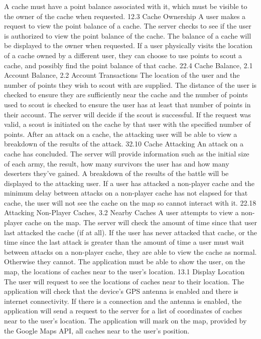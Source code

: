 {    {\footnotesize
            {A cache must have a point balance associated with it, which must be visible to the owner of the cache when requested.}
            {1}{2.3 Cache Ownership}
            {A user makes a request to view the point balance of a cache.}
            {The server checks to see if the user is authorized to view the 
            point balance of the cache.}
            {The balance of a cache will be displayed to the owner when requested.}
            {If a user physically visits the location of a cache owned by a different user, they can choose to use points to scout a cache, and possibly find the point balance of that cache.}
            {2}{2.4 Cache Balance, 2.1 Account Balance, 2.2 Account Transactions}
            {The location of the user and the number of points they wish to scout with are supplied.}
            {The distance of the user is checked to ensure they are sufficiently near the cache and the number of points used to scout is checked to ensure the user has at least that number of points in their account. The server will decide if the scout is successful.}
            {If the request was valid, a scout is initiated on the cache by that user with the specified number of points.}
            {After an attack on a cache, the attacking user will be able to
            view a breakdown of the results of the attack.}
            {3}{2.10 Cache Attacking}
            {An attack on a cache has concluded.}
            {The server will provide information such as the initial size of each army, the result, how many survivors the user has and how many deserters they've gained.}
            {A breakdown of the results of the battle will be displayed to the attacking user.}
            {If a user has attacked a non-player cache and the minimum delay between attacks on a non-player cache has not elapsed for that cache, the user will not see the cache on the map so cannot interact with it.}
            {2}{2.18 Attacking Non-Player Caches, 3.2 Nearby Caches}
            {A user attempts to view a non-player cache on the map.}
            {The server will check the amount of time since that user last attacked the cache (if at all).}
            {If the user has never attacked that cache, or the time since the last attack is greater than the amount of time a user must wait between attacks on a non-player cache, they are able to view the cache as normal. Otherwise they cannot.}
            {The application must be able to show the user, on the map, the locations of caches near to the user's location.}
            {1}{3.1 Display Location}
            {The user will request to see the locations of caches near to their location.}
            {The application will check that the device's GPS antenna is enabled and there is internet connectivity. If there is a connection and the antenna is enabled, the application will send a request to the server for a list of coordinates of caches near to the user's location.}
            {The application will mark on the map, provided by the Google Maps API, all caches near to the user's position.}
    }
}
